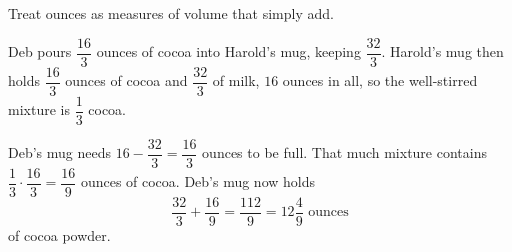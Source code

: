 Treat ounces as measures of volume that simply add.

Deb pours $\dfrac{16}{3}$ ounces of cocoa into Harold's mug, keeping $\dfrac{32}{3}$. Harold's mug then holds $\dfrac{16}{3}$ ounces of cocoa and $\dfrac{32}{3}$ of milk, $16$ ounces in all, so the well-stirred mixture is $\dfrac{1}{3}$ cocoa.

Deb's mug needs $16-\dfrac{32}{3}=\dfrac{16}{3}$ ounces to be full. That much mixture contains $\dfrac{1}{3}\cdot\dfrac{16}{3}=\dfrac{16}{9}$ ounces of cocoa. Deb's mug now holds
\[
\dfrac{32}{3}+\dfrac{16}{9}=\dfrac{112}{9}=\boxed{12\dfrac{4}{9}}\text{ ounces}
\]
of cocoa powder.
